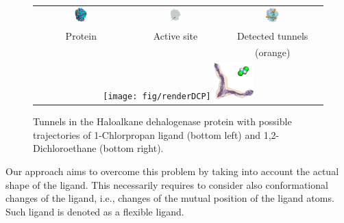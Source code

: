 \documentclass[usletter, 10pt, conference]{ieeeconf} %
\begin{document}
\begin{figure}[t]
\centering
{\footnotesize
\renewcommand{\arraystretch}{-0.5}
\renewcommand{\tabcolsep}{-1pt}
\begin{tabular}{ccc}
\includegraphics[width=0.14\textwidth]{fig/motiv1} &
\includegraphics[width=0.15\textwidth]{fig/motiv2lab} &
\includegraphics[width=0.14\textwidth]{fig/motiv3}  \\
Protein  & Active site & Detected tunnels \\ %
             &            & (orange)         \\  %
\multicolumn{3}{c}{%
\texttt{[image: fig/renderDCP]}  \hskip 15pt
\includegraphics[width=0.14\textwidth]{fig/render37t}} \\ 
\end{tabular}
}
\caption{\label{fig::motiv}
    \small
    Tunnels in the Haloalkane dehalogenase protein with possible trajectories of 1-Chlorpropan ligand (bottom left) and 1,2-Dichloroethane (bottom right).
}
\end{figure}

Our approach aims to overcome this problem by taking into account the actual shape of the ligand.
This necessarily requires to consider also conformational changes of the ligand, i.e., changes of the mutual position of the ligand atoms.
Such ligand is denoted as a flexible ligand.
\end{document}
